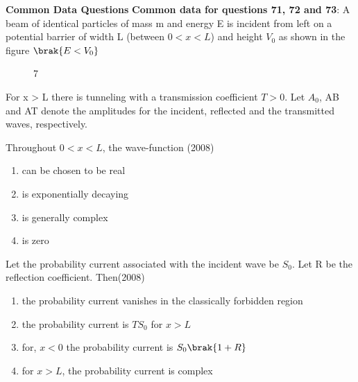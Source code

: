    
    \textbf{Common Data Questions}
    \textbf{Common data for questions 71, 72 and 73}: A beam of identical particles of mass m and energy E is incident from left on a potential barrier of width L (between $0 < x < L$) and height $V_0$ as shown in the figure $\brak{E < V_0}$
    \begin{figure}[!ht]
      \centering
      \caption{ 7}
      \label{fig 7}
  \end{figure}
    For x > L there is tunneling with a transmission coefficient $T > 0$. Let $A_0$, AB and AT denote the amplitudes for the incident, reflected and the transmitted waves, respectively.
    \item Throughout $0 < x < L$, the wave-function \hfill (2008)
      \begin{enumerate}[label=(\Alph*)]
        \item can be chosen to be real
        \item is exponentially decaying
        \item is generally complex
        \item  is zero
      \end{enumerate}
    \item  Let the probability current associated with the incident wave be $S_0$. Let R be the reflection coefficient. Then\hfill (2008)
      \begin{enumerate}[label=(\Alph*)]
        \item the probability current vanishes in the classically forbidden region
        \item the probability current is $TS_0$ for $x > L$
        \item for, $x < 0$ the probability current is $S_0\brak{1 + R}$
        \item  for $x > L$, the probability current is complex
      \end{enumerate}
